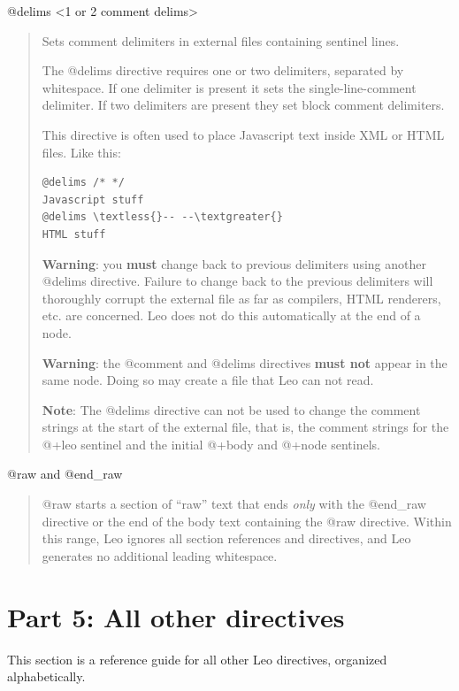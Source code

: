 \documentclass[a4paper,10pt,english]{sphinxmanual}
\begin{document}
@delims \textless{}1 or 2 comment delims\textgreater{}
\begin{quote}

Sets comment delimiters in external files containing sentinel lines.

The @delims directive requires one or two delimiters, separated by
whitespace. If one delimiter is present it sets the single-line-comment
delimiter. If two delimiters are present they set block comment delimiters.

This directive is often used to place Javascript text inside XML or HTML
files. Like this:

\begin{Verbatim}[commandchars=\\\{\}]
@delims /* */
Javascript stuff
@delims \textless{}-- --\textgreater{}
HTML stuff
\end{Verbatim}

\textbf{Warning}: you \textbf{must} change back to previous delimiters using another
@delims directive. Failure to change back to the previous delimiters will
thoroughly corrupt the external file as far as compilers, HTML renderers,
etc. are concerned. Leo does not do this automatically at the end of a node.

\textbf{Warning}: the @comment and @delims directives \textbf{must not} appear in
the same node. Doing so may create a file that Leo can not read.

\textbf{Note}: The @delims directive can not be used to change the comment
strings at the start of the external file, that is, the comment strings for
the @+leo sentinel and the initial @+body and @+node sentinels.
\end{quote}

@raw and @end\_raw
\begin{quote}

@raw starts a section of ``raw'' text that ends \emph{only} with the @end\_raw directive
or the end of the body text containing the @raw directive. Within this
range, Leo ignores all section references and directives, and Leo generates
no additional leading whitespace.
\end{quote}


\section{Part 5: All other directives}
\label{directives:part-5-all-other-directives}
This section is a reference guide for all other Leo directives, organized
alphabetically.
\end{document}
